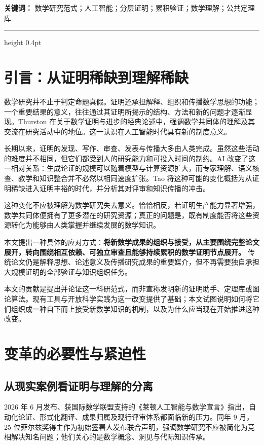 \documentclass[UTF8,11pt,a4paper,fontset=fandol]{ctexart}
\theoremstyle{definition}\newtheorem{definition}{定义}
\begin{document}
\noindent\textbf{关键词：} 数学研究范式；人工智能；分层证明；累积验证；数学理解；公共定理库
\vspace{4mm}
\hrule height 0.4pt
\section{引言：从证明稀缺到理解稀缺}
数学研究并不止于判定命题真假。证明还承担解释、组织和传播数学思想的功能；一个重要结果的意义，往往通过其证明所揭示的结构、方法和新的问题才逐渐显现。Thurston 在关于数学证明与进步的经典论述中，强调数学共同体的理解及其交流在研究活动中的地位\cite{thurston}。这一认识在人工智能时代具有新的制度意义。

长期以来，证明的发现、写作、审查、发表与传播大多由人类完成。虽然这些活动的难度并不相同，但它们都受到人的研究能力和可投入时间的制约。AI 改变了这一相对关系：生成论证的规模可以随着模型与计算资源扩大，而专家理解、语义核查、教学和知识整合并不必然以相同速度扩张。Tao 将这种可能的变化概括为从证明稀缺进入证明丰裕的时代，并分析其对评审和知识传播的冲击\cite{tao}。

这种变化不应被理解为数学研究失去意义。恰恰相反，若证明生产能力显著增强，数学共同体便拥有了更多潜在的研究资源；真正的问题是，既有制度能否将这些资源转化为能够由人类掌握并继续发展的数学知识。

本文提出一种具体的应对方式：\textbf{将新数学成果的组织与接受，从主要围绕完整论文展开，转向围绕相互依赖、可独立审查且能够持续累积的数学证明节点展开。} 传统论文仍是解释思想、论述意义及传播研究成果的重要媒介，但不再需要独自承担大规模证明的全部验证与知识组织任务。

本文的贡献是提出并论证这一科研范式，而非宣称发明新的证明助手、定理库或图论算法。现有工具与开放科学实践为这一改变提供了基础；本文试图说明如何将它们组织成一种自下而上接受新数学知识的机制，以及为什么应当现在开始推进这种改变。

\section{变革的必要性与紧迫性}
\subsection{从现实案例看证明与理解的分离}
2026 年 6 月发布、获国际数学联盟支持的《莱顿人工智能与数学宣言》指出，自动化论证、形式化翻译、成果归属及现行评审体系都面临新的压力\cite{leiden}。同年 9 月，25 位菲尔兹奖得主作为初始签署人发布联合声明，强调数学研究不应被简化为竞相解决知名问题；他们关心的是数学概念、洞见与代际知识传承\cite{fields}。
\end{document}
